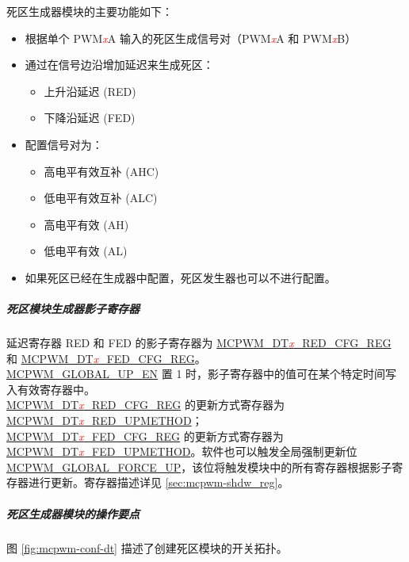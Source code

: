 \documentclass[main\_\_CN.tex]{subfiles}
\begin{document}
死区生成器模块的主要功能如下：
\begin{itemize}
    \item 根据单个 PWM\textcolor{red}{\it{x}}A 输入的死区生成信号对（PWM\textcolor{red}{\it{x}}A 和 PWM\textcolor{red}{\it{x}}B）
    \item 通过在信号边沿增加延迟来生成死区：
    \begin{itemize}
        \item 上升沿延迟 (RED) 
        \item 下降沿延迟 (FED) 
    \end{itemize}
    \item 配置信号对为：
    \begin{itemize}
        \item 高电平有效互补 (AHC) 
        \item 低电平有效互补 (ALC) 
        \item 高电平有效 (AH) 
        \item 低电平有效 (AL) 
    \end{itemize}
    \item 如果死区已经在生成器中配置，死区发生器也可以不进行配置。

\end{itemize}

\subparagraph{死区模块生成器影子寄存器}

延迟寄存器 RED 和 FED 的影子寄存器为 \hyperref[regdesc:MCPWMDT0REDCFGREG]{MCPWM\_DT\textcolor{red}{\it{x}}\_RED\_CFG\_REG} 和 \hyperref[regdesc:MCPWMDT0FEDCFGREG]{MCPWM\_DT\textcolor{red}{\it{x}}\_FED\_CFG\_REG}。\\\hyperref[fielddesc:MCPWMGLOBALUPEN]{MCPWM\_GLOBAL\_UP\_EN} 置 1 时，影子寄存器中的值可在某个特定时间写入有效寄存器中。\\\hyperref[regdesc:MCPWMDT0REDCFGREG]{MCPWM\_DT\textcolor{red}{\it{x}}\_RED\_CFG\_REG} 的更新方式寄存器为 \hyperref[fielddesc:MCPWMDT0REDUPMETHOD]{MCPWM\_DT\textcolor{red}{\it{x}}\_RED\_UPMETHOD}； \\\hyperref[regdesc:MCPWMDT0FEDCFGREG]{MCPWM\_DT\textcolor{red}{\it{x}}\_FED\_CFG\_REG} 的更新方式寄存器为 \hyperref[fielddesc:MCPWMDT0FEDUPMETHOD]{MCPWM\_DT\textcolor{red}{\it{x}}\_FED\_UPMETHOD}。软件也可以触发全局强制更新位 \hyperref[fielddesc:MCPWMGLOBALFORCEUP]{MCPWM\_GLOBAL\_FORCE\_UP}，该位将触发模块中的所有寄存器根据影子寄存器进行更新。寄存器描述详见 \ref{sec:mcpwm-shdw_reg}。

\clearpage
\subparagraph{死区生成器模块的操作要点}
 图 \ref{fig:mcpwm-conf-dt} 描述了创建死区模块的开关拓扑。
\end{document}
